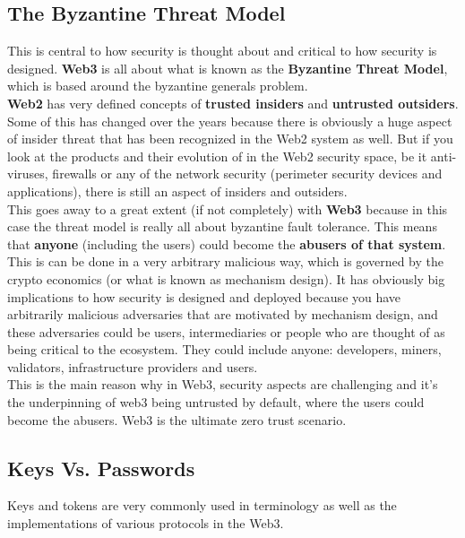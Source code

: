 \subsection*{The Byzantine Threat Model}

This is central to how security is thought about and critical to how security is designed.
\textbf{Web3} is all about what is known as the \textbf{Byzantine Threat Model}, which is based around the byzantine generals problem.\\

\textbf{Web2} has very defined concepts of \textbf{trusted insiders} and \textbf{untrusted outsiders}.
Some of this has changed over the years because there is obviously a huge aspect of insider threat that has been recognized in the Web2 system as well.
But if you look at the products and their evolution of in the Web2 security space, be it anti-viruses, firewalls or any of the network security (perimeter security devices and applications), there is still an aspect of insiders and outsiders.\\

This goes away to a great extent (if not completely) with \textbf{Web3} because in this case the threat model is really all about byzantine fault tolerance.
This means that \textbf{anyone} (including the users) could become the \textbf{abusers of that system}.
This is can be done in a very arbitrary malicious way, which  is governed by the crypto economics (or what is known as mechanism design).
It has obviously big implications to how security is designed and deployed because you have arbitrarily malicious adversaries that are motivated by mechanism design, and these adversaries could be users, intermediaries or people who are thought of as being critical to the ecosystem.
They could include anyone: developers, miners, validators, infrastructure providers and users.\\

This is the main reason why in Web3, security aspects are challenging and it's the underpinning of web3 being untrusted by default, where the users could become the abusers.
Web3 is the ultimate zero trust scenario.

\subsection*{Keys Vs. Passwords}
Keys and tokens are very commonly used in terminology as well as the implementations of various protocols in the Web3.\\

